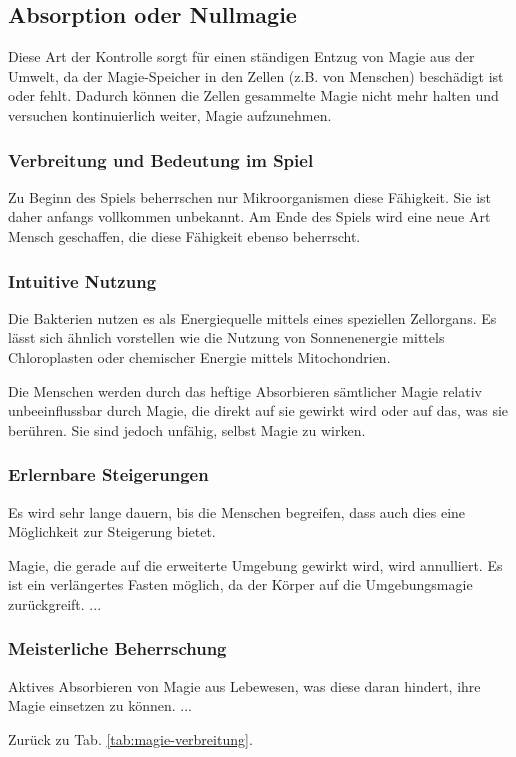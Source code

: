 \subsection{Absorption oder Nullmagie}\label{magie:absorption}
Diese Art der Kontrolle sorgt für einen ständigen Entzug von Magie aus der Umwelt, da der Magie-Speicher in den Zellen (z.B. von Menschen) beschädigt ist oder fehlt. 
Dadurch können die Zellen gesammelte Magie nicht mehr halten und versuchen kontinuierlich weiter, Magie aufzunehmen.

\subsubsection{Verbreitung und Bedeutung im Spiel}
Zu Beginn des Spiels beherrschen nur Mikroorganismen diese Fähigkeit. Sie ist daher anfangs vollkommen unbekannt. 
Am Ende des Spiels wird eine neue Art Mensch geschaffen, die diese Fähigkeit ebenso beherrscht.

\subsubsection{Intuitive Nutzung}
Die Bakterien nutzen es als Energiequelle mittels eines speziellen Zellorgans. 
Es lässt sich ähnlich vorstellen wie die Nutzung von Sonnenenergie mittels Chloroplasten oder chemischer Energie mittels Mitochondrien. 

Die Menschen werden durch das heftige Absorbieren sämtlicher Magie relativ unbeeinflussbar durch Magie, die direkt auf sie gewirkt wird oder auf das, was sie berühren. 
Sie sind jedoch unfähig, selbst Magie zu wirken.

\subsubsection{Erlernbare Steigerungen}
Es wird sehr lange dauern, bis die Menschen begreifen, dass auch dies eine Möglichkeit zur Steigerung bietet.
\begin{outline}
	\1 Magie, die gerade auf die erweiterte Umgebung gewirkt wird, wird annulliert.
	\1 Es ist ein verlängertes Fasten möglich, da der Körper auf die Umgebungsmagie zurückgreift.
	\1 ...
\end{outline}

\subsubsection{Meisterliche Beherrschung} 
\begin{outline}
	\1 Aktives Absorbieren von Magie aus Lebewesen, was diese daran hindert, ihre Magie einsetzen zu können.
	\1 ...
\end{outline}
Zurück zu Tab. \ref{tab:magie-verbreitung}.




